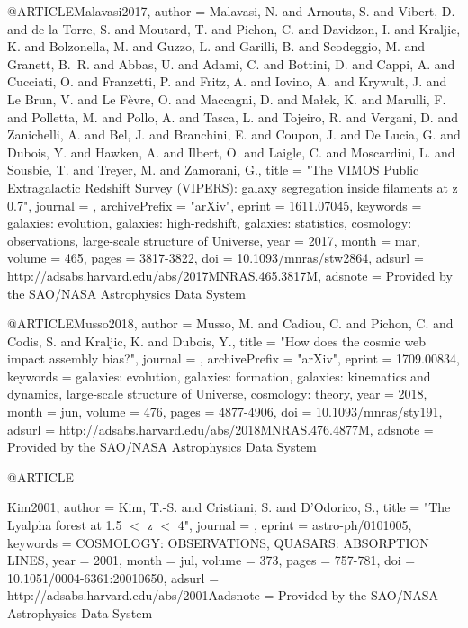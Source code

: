 \documentclass{aa}
\begin{document}
{{{{{{{{@ARTICLE{Malavasi2017,
   author = {{Malavasi}, N. and {Arnouts}, S. and {Vibert}, D. and {de la Torre}, S. and 
	{Moutard}, T. and {Pichon}, C. and {Davidzon}, I. and {Kraljic}, K. and 
	{Bolzonella}, M. and {Guzzo}, L. and {Garilli}, B. and {Scodeggio}, M. and 
	{Granett}, B.~R. and {Abbas}, U. and {Adami}, C. and {Bottini}, D. and 
	{Cappi}, A. and {Cucciati}, O. and {Franzetti}, P. and {Fritz}, A. and 
	{Iovino}, A. and {Krywult}, J. and {Le Brun}, V. and {Le F{\`e}vre}, O. and 
	{Maccagni}, D. and {Ma{\l}ek}, K. and {Marulli}, F. and {Polletta}, M. and 
	{Pollo}, A. and {Tasca}, L. and {Tojeiro}, R. and {Vergani}, D. and 
	{Zanichelli}, A. and {Bel}, J. and {Branchini}, E. and {Coupon}, J. and 
	{De Lucia}, G. and {Dubois}, Y. and {Hawken}, A. and {Ilbert}, O. and 
	{Laigle}, C. and {Moscardini}, L. and {Sousbie}, T. and {Treyer}, M. and 
	{Zamorani}, G.},
    title = "{The VIMOS Public Extragalactic Redshift Survey (VIPERS): galaxy segregation inside filaments at z {\sime} 0.7}",
  journal = {\mnras},
archivePrefix = "arXiv",
   eprint = {1611.07045},
 keywords = {galaxies: evolution, galaxies: high-redshift, galaxies: statistics, cosmology: observations, large-scale structure of Universe},
     year = 2017,
    month = mar,
   volume = 465,
    pages = {3817-3822},
      doi = {10.1093/mnras/stw2864},
   adsurl = {http://adsabs.harvard.edu/abs/2017MNRAS.465.3817M},
  adsnote = {Provided by the SAO/NASA Astrophysics Data System}
}

@ARTICLE{Musso2018,
   author = {{Musso}, M. and {Cadiou}, C. and {Pichon}, C. and {Codis}, S. and 
	{Kraljic}, K. and {Dubois}, Y.},
    title = "{How does the cosmic web impact assembly bias?}",
  journal = {\mnras},
archivePrefix = "arXiv",
   eprint = {1709.00834},
 keywords = {galaxies: evolution, galaxies: formation, galaxies: kinematics and dynamics, large-scale structure of Universe, cosmology: theory},
     year = 2018,
    month = jun,
   volume = 476,
    pages = {4877-4906},
      doi = {10.1093/mnras/sty191},
   adsurl = {http://adsabs.harvard.edu/abs/2018MNRAS.476.4877M},
  adsnote = {Provided by the SAO/NASA Astrophysics Data System}
}

@ARTICLE{Kim2001,
   author = {{Kim}, T.-S. and {Cristiani}, S. and {D'Odorico}, S.},
    title = "{The Lyalpha forest at 1.5 $\lt$ z $\lt$ 4}",
  journal = {\aap},
   eprint = {astro-ph/0101005},
 keywords = {COSMOLOGY: OBSERVATIONS, QUASARS: ABSORPTION LINES},
     year = 2001,
    month = jul,
   volume = 373,
    pages = {757-781},
      doi = {10.1051/0004-6361:20010650},
   adsurl = {http://adsabs.harvard.edu/abs/2001Aadsnote = {Provided by the SAO/NASA Astrophysics Data System}
}

}}}}}}}}}
\end{document}
